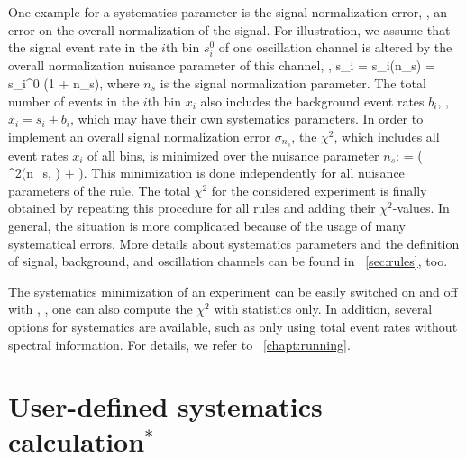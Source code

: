  One example for a systematics parameter is the signal normalization error, \ie, an error on the overall normalization of the signal. For illustration, we assume that the signal event rate in the $i$th bin $s_i^0$ of one oscillation channel is altered by the overall normalization nuisance parameter of this channel, \ie , 
\be
 s_i = s_i(n_s) = s_i^0 \cdot (1 + n_s),
\ee
where $n_s$ is the signal normalization parameter. The total number of events in the $i$th bin $x_i$ also includes the background event rates $b_i$, \ie, $x_i = s_i + b_i$, which may have their own systematics parameters.
In order to implement an overall signal normalization error $\sigma_{n_s}$,  the $\chi^2$, which includes all event rates $x_i$ of all bins, is minimized over the nuisance parameter $n_s$:
\be
  =  \left(  \chi^2(n_s, \hdots) +  \right).
\ee 
This minimization is done independently for all nuisance parameters of the rule. The total $\chi^2$ for the considered experiment is finally obtained by repeating this procedure for all rules and adding their $\chi^2$-values. In general, the situation is more complicated because of the usage of many systematical errors. More details about systematics parameters and the definition of signal, background, and oscillation channels can be found in \Sec~\ref{sec:rules}, too.

The systematics minimization of an experiment can be easily switched on and off with , \ie, one can also compute the $\chi^2$ with statistics only. In addition, several options for 
systematics are available, such as only using total event rates without
spectral information. For details, we refer to \Chapt~\ref{chapt:running}.


\section{User-defined systematics calculation$^*$}
\label{sec:userchi}



